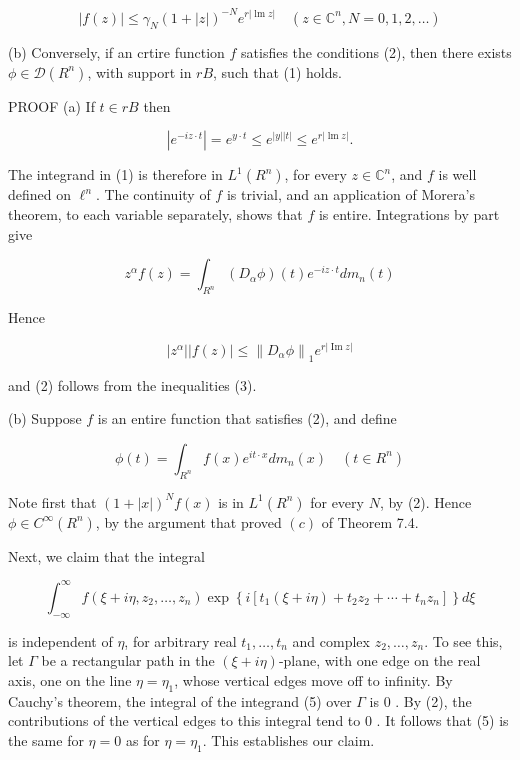 \documentclass[10pt]{article}
\begin{document}
$$
|f(z)| \leq \gamma_{N}(1+|z|)^{-N} e^{r|\operatorname{lm} z|} \quad\left(z \in \mathbb{C}^{n}, N=0,1,2, \ldots\right)
$$

(b) Conversely, if an crtire function $f$ satisfies the conditions (2), then there exists $\phi \in \mathscr{D}\left(R^{n}\right)$, with support in $r B$, such that (1) holds.

PROOF (a) If $t \in r B$ then

$$
\left|e^{-i z \cdot t}\right|=e^{y \cdot t} \leq e^{|y||t|} \leq e^{r|\operatorname{lm} z|} .
$$

The integrand in (1) is therefore in $L^{1}\left(R^{n}\right)$, for every $z \in \mathbb{C}^{n}$, and $f$ is well defined on $\ell^{n}$. The continuity of $f$ is trivial, and an application of Morera's theorem, to each variable separately, shows that $f$ is entire. Integrations by part give

$$
z^{\alpha} f(z)=\int_{R^{n}}\left(D_{\alpha} \phi\right)(t) e^{-i z \cdot t} d m_{n}(t)
$$

Hence

$$
\left|z^{\alpha}\right||f(z)| \leq\left\|D_{\alpha} \phi\right\|_{1} e^{r|\operatorname{Im} z|}
$$

and (2) follows from the inequalities (3).

(b) Suppose $f$ is an entire function that satisfies (2), and define

$$
\phi(t)=\int_{R^{n}} f(x) e^{i t \cdot x} d m_{n}(x) \quad\left(t \in R^{n}\right)
$$

Note first that $(1+|x|)^{N} f(x)$ is in $L^{1}\left(R^{n}\right)$ for every $N$, by (2). Hence $\phi \in C^{\infty}\left(R^{n}\right)$, by the argument that proved $(c)$ of Theorem 7.4.

Next, we claim that the integral

$$
\int_{-\infty}^{\infty} f\left(\xi+i \eta, z_{2}, \ldots, z_{n}\right) \exp \left\{i\left[t_{1}(\xi+i \eta)+t_{2} z_{2}+\cdots+t_{n} z_{n}\right]\right\} d \xi
$$

is independent of $\eta$, for arbitrary real $t_{1}, \ldots, t_{n}$ and complex $z_{2}, \ldots, z_{n}$. To see this, let $\Gamma$ be a rectangular path in the $(\xi+i \eta)$-plane, with one edge on the real axis, one on the line $\eta=\eta_{1}$, whose vertical edges move off to infinity. By Cauchy's theorem, the integral of the integrand (5) over $\Gamma$ is 0 . By (2), the contributions of the vertical edges to this integral tend to 0 . It follows that (5) is the same for $\eta=0$ as for $\eta=\eta_{1}$. This establishes our claim.
\end{document}

